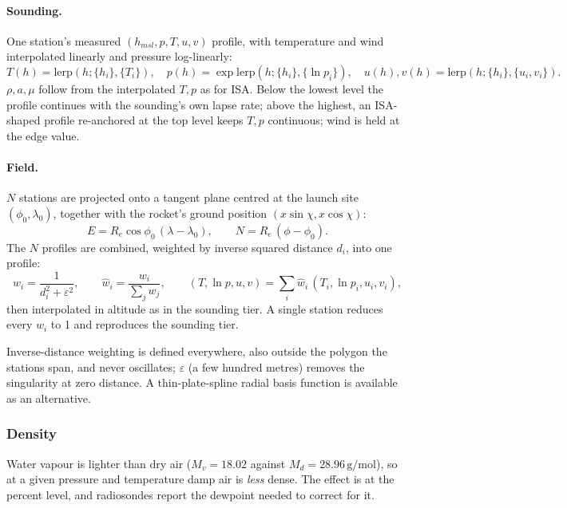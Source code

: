 \paragraph{Sounding.} One station's measured $(h_{msl}, p, T, u, v)$ profile, with temperature and
wind interpolated linearly and pressure log-linearly:
\begin{equation}
    T(h) = \mathrm{lerp}(h;\{h_i\},\{T_i\}), \quad
    p(h) = \exp\mathrm{lerp}(h;\{h_i\},\{\ln p_i\}), \quad
    u(h),v(h) = \mathrm{lerp}(h;\{h_i\},\{u_i,v_i\}).
\end{equation}
$\rho, a, \mu$ follow from the interpolated $T, p$ as for ISA. Below the lowest level the profile
continues with the sounding's own lapse rate; above the highest, an ISA-shaped profile re-anchored
at the top level keeps $T, p$ continuous; wind is held at the edge value.

\paragraph{Field.} $N$ stations are projected onto a tangent plane centred at the launch site
$(\phi_0,\lambda_0)$, together with the rocket's ground position $(x\sin\chi, x\cos\chi)$:
\begin{equation}
    E = R_e\cos\phi_0\,(\lambda-\lambda_0), \qquad N = R_e\,(\phi-\phi_0).
\end{equation}
The $N$ profiles are combined, weighted by inverse squared distance $d_i$, into one profile:
\begin{equation}
    w_i = \frac{1}{d_i^2+\varepsilon^2}, \qquad \hat{w}_i = \frac{w_i}{\sum_j w_j}, \qquad
    (T, \ln p, u, v) = \sum_i \hat{w}_i\,(T_i, \ln p_i, u_i, v_i),
\end{equation}
then interpolated in altitude as in the sounding tier. A single station reduces every
$\hat{w}_i$ to 1 and reproduces the sounding tier.

Inverse-distance weighting is defined everywhere, also outside the polygon the stations span, and
never oscillates; $\varepsilon$ (a few hundred metres) removes the singularity at zero distance. A
thin-plate-spline radial basis function is available as an alternative.

\subsubsection{Density}\label{sec:density}
Water vapour is lighter than dry air ($M_v=18.02$ against $M_d=28.96\,\mathrm{g/mol}$), so at a
given pressure and temperature damp air is \emph{less} dense. The effect is at the percent level,
and radiosondes report the dewpoint needed to correct for it.

